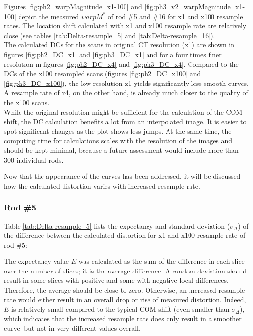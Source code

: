Figures \ref{fig:ph2_warpMagnitude_x1-100} and \ref{fig:ph3_v2_warpMagnitude_x1-100} depict the measured $warpM^*$ of rod \#5 and \#16 for x1 and x100 resample rates.
The location shift calculated with x1 and x100 resample rate are relatively close (see tables \ref{tab:Delta-resample_5} and \ref{tab:Delta-resample_16}).\\

The calculated DCs for the scans in original CT resolution (x1) are shown in figures \ref{fig:ph2_DC_x1} and \ref{fig:ph3_DC_x1} and for a four times finer resolution in figures \ref{fig:ph2_DC_x4} and \ref{fig:ph3_DC_x4}.
Compared to the DCs of the x100 resampled scans (figures \ref{fig:ph2_DC_x100} and \ref{fig:ph3_DC_x100}), the low resolution x1 yields significantly less smooth curves.
A resample rate of x4, on the other hand, is already much closer to the quality of the x100 scans.\\

While the original resolution might be sufficient for the calculation of the COM shift, the DC calculation benefits a lot from an interpolated image.
It is easier to spot significant changes as the plot shows less jumps.
At the same time, the computing time for calculations scales with the resolution of the images and should be kept minimal, because a future assessment would include more than 300 individual rods.

Now that the appearance of the curves has been addressed, it will be discussed how the calculated distortion varies with increased resample rate.

\subsubsection{Rod \#5}

Table \ref{tab:Delta-resample_5} lists the expectancy and standard deviation ($\sigma_\Delta$) of the difference between the calculated distortion for x1 and x100 resample rate of rod \#5:

The expectancy value $E$ was calculated as the sum of the difference in each slice over the number of slices; it is the average difference.
A random deviation should result in some slices with positive and some with negative local differences.
Therefore, the average should be close to zero.
Otherwise, an increased resample rate would either result in an overall drop or rise of measured distortion.
Indeed, $E$ is relatively small compared to the typical COM shift (even smaller than $\sigma_\Delta$), which indicates that the increased resample rate does only result in a smoother curve, but not in very different values overall.

